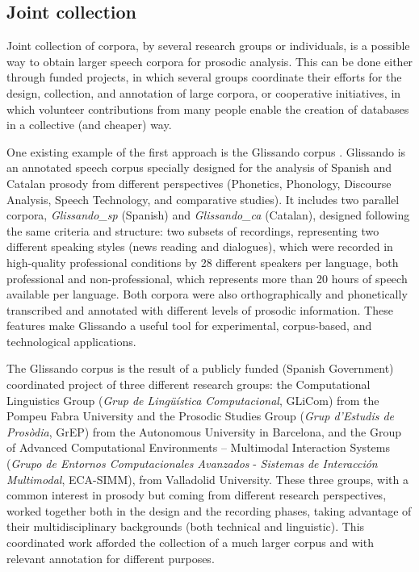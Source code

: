\documentclass[output=paper]{langsci/langscibook}
\begin{document}
\subsection{Joint collection}\largerpage[-1]
Joint collection of corpora, by several research groups or individuals, is a possible way to obtain larger speech corpora for prosodic analysis. This can be done either through funded projects, in which several groups coordinate their efforts for the design, collection, and annotation of large corpora, or cooperative initiatives, in which volunteer contributions from many people enable the creation of databases in a collective (and cheaper) way.

One existing example of the first approach is the Glissando corpus \citep{Garrido2013Glissando}. Glissando is an annotated speech corpus specially designed for the analysis of Spanish and Catalan prosody from different perspectives (Phonetics, Phonology, Discourse Analysis, Speech Technology, and comparative studies). It includes two parallel corpora, \textit{Glissando\_sp} (Spanish) and \textit{Glissando\_ca} (Catalan), designed following the same criteria and structure: two subsets of recordings, representing two different speaking styles (news reading and dialogues), which were recorded in high-quality professional conditions by 28 different speakers per language, both professional and non-professional, which represents more than 20 hours of speech available per language. Both corpora were also orthographically and phonetically transcribed and annotated with different levels of prosodic information. These features make Glissando a useful tool for experimental, corpus-based, and technological applications. 

The Glissando corpus is the result of a publicly funded (Spanish Government) coordinated project of three different research groups: the Computational Linguistics Group (\textit{Grup de Lingüística Computacional}, GLiCom) from the Pompeu Fabra University and the Prosodic Studies Group (\textit{Grup d'Estudis de Prosòdia}, GrEP) from the Autonomous University in Barcelona, and the Group of Advanced Computational Environments – Multimodal Interaction Systems (\textit{Grupo de Entornos Computacionales Avanzados} - \textit{Sistemas de Interacción Multimodal}, ECA-SIMM), from Valladolid University. These three groups, with a common interest in prosody but coming from different research perspectives, worked together both in the design and the recording phases, taking advantage of their multidisciplinary backgrounds (both technical and linguistic). This coordinated work afforded the collection of a much larger corpus and with relevant annotation for different purposes.
\end{document}
